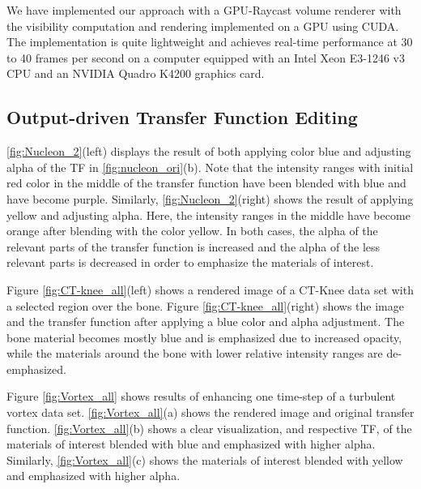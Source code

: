\documentclass[twoside,twocolumn,10pt]{article}
\begin{document}
We have implemented our approach with a GPU-Raycast volume renderer with the visibility computation and rendering implemented on a GPU using CUDA. The implementation is quite lightweight and achieves real-time performance at 30 to 40 frames per second on a computer equipped with an Intel Xeon E3-1246 v3 CPU and an NVIDIA Quadro K4200 graphics card.

\subsection{Output-driven Transfer Function Editing}

\autoref{fig:Nucleon_2}(left) displays the result of both applying color blue and adjusting alpha of the TF in \autoref{fig:nucleon_ori}(b). Note that the intensity ranges with initial red color in the middle of the transfer function have been blended with blue and have become purple.
Similarly, \autoref{fig:Nucleon_2}(right) shows the result of applying yellow and adjusting alpha. Here, the intensity ranges in the middle have become orange after blending with the color yellow. 
In both cases, the alpha of the relevant parts of the transfer function is increased and the alpha of the less relevant parts is decreased in order to emphasize the materials of interest.

Figure \ref{fig:CT-knee_all}(left) shows a rendered image of a CT-Knee data set with a selected region over the bone. Figure \ref{fig:CT-knee_all}(right) shows the image and the transfer function after applying a blue color and alpha adjustment. The bone material becomes mostly blue and is emphasized due to increased opacity, while the materials around the bone with lower relative intensity ranges are de-emphasized.

Figure \ref{fig:Vortex_all} shows results of enhancing one time-step of a turbulent vortex data set.
\autoref{fig:Vortex_all}(a) shows the rendered image and original transfer function.
\autoref{fig:Vortex_all}(b) shows a clear visualization, and respective TF, of the materials of interest blended with blue and emphasized with higher alpha.
Similarly, \autoref{fig:Vortex_all}(c) shows the materials of interest blended with yellow and emphasized with higher alpha.
\end{document}
